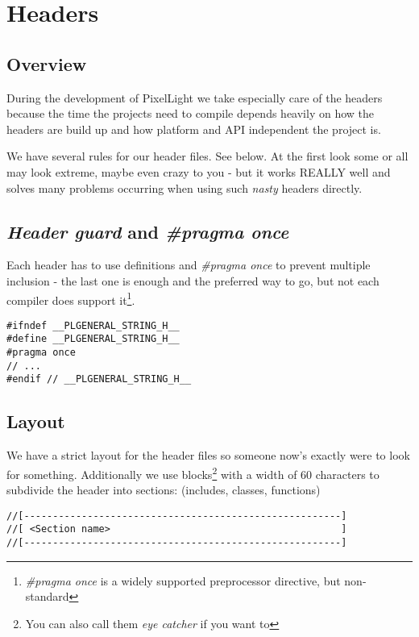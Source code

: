 \chapter{Headers}




\section{Overview}
During the development of PixelLight we take especially care of the headers because the time the projects need to compile depends heavily on how the headers are build up and how platform and API independent the project is.

We have several rules for our header files. See below. At the first look some or all may look extreme, maybe even crazy to you - but it works REALLY well and solves many problems occurring when using such \emph{nasty} headers directly.




\section{\emph{Header guard} and \emph{\#pragma once}}
Each header has to use definitions and \emph{\#pragma once} to prevent multiple inclusion - the last one is enough and the preferred way to go, but not each compiler does support it\footnote{\emph{\#pragma once} is a widely supported preprocessor directive, but non-standard}.

\begin{lstlisting}[caption=Header guard]
#ifndef __PLGENERAL_STRING_H__
#define __PLGENERAL_STRING_H__
#pragma once
// ...
#endif // __PLGENERAL_STRING_H__
\end{lstlisting}




\section{Layout}
We have a strict layout for the header files so someone now's exactly were to look for something. Additionally we use blocks\footnote{You can also call them \emph{eye catcher} if you want to} with a width of 60 characters to subdivide the header into sections: (includes, classes, functions)

\begin{lstlisting}[caption=Code section comment blocks]
//[-------------------------------------------------------]
//[ <Section name>                                        ]
//[-------------------------------------------------------]
\end{lstlisting}

